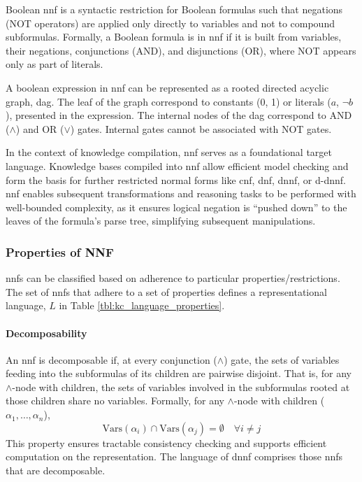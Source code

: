 Boolean \acrfull{nnf} is a syntactic restriction for Boolean formulas such that negations (NOT operators) are applied only directly to variables and not to compound subformulas. Formally, a Boolean formula is in \acrshort{nnf} if it is built from variables, their negations, conjunctions (AND), and disjunctions (OR), where NOT appears only as part of literals.

A boolean expression in \acrshort{nnf} can be represented as a rooted directed acyclic graph, \acrshort{dag}. The leaf of the graph correspond to constants (0, 1) or literals ($a$, $\neg b$), presented in the expression. The internal nodes of the \acrshort{dag} correspond to AND ($\land$) and OR ($\lor$) gates. Internal gates cannot be associated with NOT gates.

In the context of knowledge compilation, \acrshort{nnf} serves as a foundational target language. Knowledge bases compiled into \acrshort{nnf} allow efficient model checking and form the basis for further restricted normal forms like \acrfull{cnf}, \acrfull{dnf}, \acrfull{dnnf}, or \acrfull{d-dnnf}. \acrshort{nnf} enables subsequent transformations and reasoning tasks to be performed with well-bounded complexity, as it ensures logical negation is ``pushed down'' to the leaves of the formula's parse tree, simplifying subsequent manipulations.

\subsubsection{Properties of NNF}
 \acrshort{nnf}s can be classified based on adherence to particular properties/restrictions. The set of  \acrshort{nnf}s that adhere to a set of properties defines a representational language, $L$ in Table \ref{tbl:kc_language_properties}.

\paragraph{Decomposability}
An \acrshort{nnf} is decomposable if, at every conjunction ($\land$) gate, the sets of variables feeding into the subformulas of its children are pairwise disjoint. That is, for any $\wedge$-node with children, the sets of variables involved in the subformulas rooted at those children share no variables. 
Formally, for any $\wedge$-node with children ($\alpha_1, \ldots, \alpha_n$),
\[
\mathrm{Vars}(\alpha_i) \cap \mathrm{Vars}(\alpha_j) = \emptyset \quad \forall i \neq j
\]
This property ensures tractable consistency checking and supports efficient computation on the representation. The language of \acrshort{dnnf} comprises those \acrshort{nnf}s that are decomposable.

